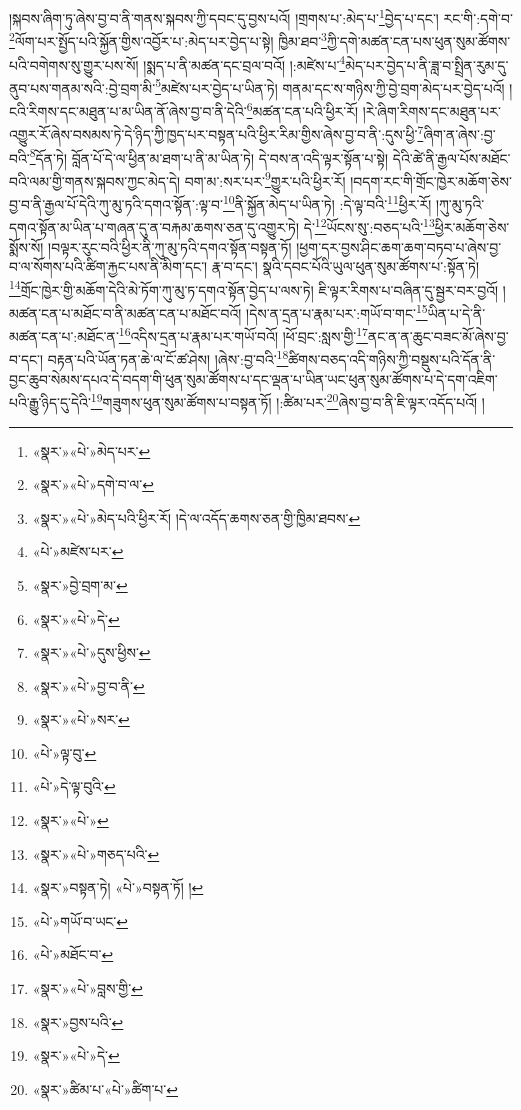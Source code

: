 །སྐབས་ཞིག་ཏུ་ཞེས་བྱ་བ་ནི་གནས་སྐབས་ཀྱི་དབང་དུ་བྱས་པའོ། །གྲགས་པ་:མེད་པ་\footnote{«སྣར་»«པེ་»མེད་པར་}བྱེད་པ་དང་། རང་གི་:དགེ་བ་\footnote{«སྣར་»«པེ་»དགེ་བ་ལ་}ལོག་པར་སྤྱོད་པའི་སྐྱོན་གྱིས་འབྱོར་པ་:མེད་པར་བྱེད་པ་སྟེ། ཁྱིམ་ཐབ་\footnote{«སྣར་»«པེ་»མེད་པའི་ཕྱིར་རོ། །དེ་ལ་འདོད་ཆགས་ཅན་གྱི་ཁྱིམ་ཐབས་}ཀྱི་དགེ་མཚན་ངན་པས་ཕུན་སུམ་ཚོགས་པའི་བགེགས་སུ་གྱུར་པས་སོ། །སྨད་པ་ནི་མཚན་དང་བྲལ་བའོ། །:མཛེས་པ་\footnote{«པེ་»མཛེས་པར་}མེད་པར་བྱེད་པ་ནི་ཟླ་བ་སྤྲིན་རུམ་དུ་ནུབ་པས་གནམ་སའི་:བྱེ་བྲག་མི་\footnote{«སྣར་»བྱེ་བྲག་མ་}མཛེས་པར་བྱེད་པ་ཡིན་ཏེ། གནམ་དང་ས་གཉིས་ཀྱི་བྱེ་བྲག་མེད་པར་བྱེད་པའོ། །ངའི་རིགས་དང་མཐུན་པ་མ་ཡིན་ནོ་ཞེས་བྱ་བ་ནི་དེའི་\footnote{«སྣར་»«པེ་»དེ་}མཚན་ངན་པའི་ཕྱིར་རོ། །རེ་ཞིག་རིགས་དང་མཐུན་པར་འགྱུར་རོ་ཞེས་བསམས་ཏེ་དེ་ཉིད་ཀྱི་ཁྱད་པར་བསྟན་པའི་ཕྱིར་རིམ་གྱིས་ཞེས་བྱ་བ་ནི་:དུས་ཕྱི་\footnote{«སྣར་»«པེ་»དུས་ཕྱིས་}ཞིག་ན་ཞེས་:བྱ་བའི་\footnote{«སྣར་»«པེ་»བྱ་བ་ནི་}དོན་ཏེ། བློན་པོ་དེ་ལ་ཕྱིན་མ་ཐག་པ་ནི་མ་ཡིན་ཏེ། དེ་བས་ན་འདི་ལྟར་སྟོན་པ་སྟེ། དེའི་ཚེ་ནི་རྒྱལ་པོས་མཐོང་བའི་ལམ་གྱི་གནས་སྐབས་ཀྱང་མེད་དེ། བག་མ་:སར་པར་\footnote{«སྣར་»«པེ་»སར་}གྱུར་པའི་ཕྱིར་རོ། །བདག་རང་གི་གྲོང་ཁྱེར་མཆོག་ཅེས་བྱ་བ་ནི་རྒྱལ་པོ་དེའི་ཀུ་མུ་ཏའི་དགའ་སྟོན་:ལྟ་བ་\footnote{«པེ་»ལྟ་བུ་}ནི་སྐྱོན་མེད་པ་ཡིན་ཏེ། :དེ་ལྟ་བའི་\footnote{«པེ་»དེ་ལྟ་བུའི་}ཕྱིར་རོ། །ཀུ་མུ་ཏའི་དགའ་སྟོན་མ་ཡིན་པ་གཞན་དུ་ན་བརྐམ་ཆགས་ཅན་དུ་འགྱུར་ཏེ། དེ་\footnote{«སྣར་»«པེ་»}ཡོངས་སུ་:བཅད་པའི་\footnote{«སྣར་»«པེ་»གཅད་པའི་}ཕྱིར་མཆོག་ཅེས་སྨོས་སོ། །བལྟར་རུང་བའི་ཕྱིར་ནི་ཀུ་མུ་ཏའི་དགའ་སྟོན་བསྟན་ཏོ། །ཕྱག་དར་བྱས་ཤིང་ཆག་ཆག་བཏབ་པ་ཞེས་བྱ་བ་ལ་སོགས་པའི་ཚིག་རྐྱང་པས་ནི་མིག་དང་། རྣ་བ་དང་། སྣའི་དབང་པོའི་ཡུལ་ཕུན་སུམ་ཚོགས་པ་:སྟོན་ཏེ། \footnote{«སྣར་»བསྟན་ཏེ། «པེ་»བསྟན་ཏོ། ། }གྲོང་ཁྱེར་གྱི་མཆོག་དེའི་མེ་ཏོག་ཀུ་མུ་ཏ་དགའ་སྟོན་བྱེད་པ་ལས་ཏེ། ཇི་ལྟར་རིགས་པ་བཞིན་དུ་སྦྱར་བར་བྱའོ། །མཚན་ངན་པ་མཐོང་བ་ནི་མཚན་ངན་པ་མཐོང་བའོ། །དེས་ན་དྲན་པ་རྣམ་པར་:གཡོ་བ་གང་\footnote{«པེ་»གཡོ་བ་ཡང་}ཡིན་པ་དེ་ནི་མཚན་ངན་པ་:མཐོང་ན་\footnote{«པེ་»མཐོང་བ་}འདིས་དྲན་པ་རྣམ་པར་གཡོ་བའོ། །ཕོ་བྲང་:སླས་གྱི་\footnote{«སྣར་»«པེ་»བླས་གྱི་}ནང་ན་ན་ཆུང་བཟང་མོ་ཞེས་བྱ་བ་དང་། བརྟན་པའི་ཡོན་ཏན་ཆེ་ལ་ངོ་ཚ་ཤེས། །ཞེས་:བྱ་བའི་\footnote{«སྣར་»བྱས་པའི་}ཚིགས་བཅད་འདི་གཉིས་ཀྱི་བསྡུས་པའི་དོན་ནི་བྱང་ཆུབ་སེམས་དཔའ་དེ་བདག་གི་ཕུན་སུམ་ཚོགས་པ་དང་ལྡན་པ་ཡིན་ཡང་ཕུན་སུམ་ཚོགས་པ་དེ་དག་འཇིག་པའི་རྒྱུ་ཉིད་དུ་དེའི་\footnote{«སྣར་»«པེ་»དེ་}གཟུགས་ཕུན་སུམ་ཚོགས་པ་བསྟན་ཏོ། །:ཚིམ་པར་\footnote{«སྣར་»ཚིམ་པ་«པེ་»ཚིག་པ་}ཞེས་བྱ་བ་ནི་ཇི་ལྟར་འདོད་པའོ། །
